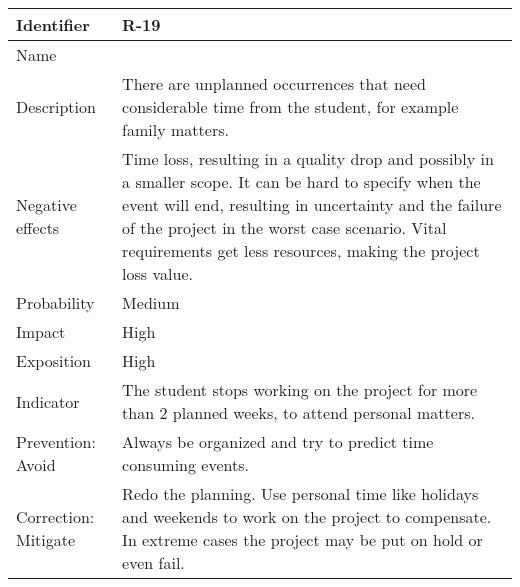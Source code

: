 \begin{table}[H]
	\begin{tabularx}{\textwidth}{|y|z|}
		\hline
		Identifier & \textbf{R-19} \\ \hline
		Name & \Rdiecinueve \\ \hline
		Description &
			There are unplanned occurrences that need considerable time from the student, for example family matters.
		\\ \hline
		Negative effects &
			Time loss, resulting in a quality drop and possibly in a smaller scope.\linej
			It can be hard to specify when the event will end, resulting in uncertainty and the failure of the project in the worst case scenario.
			\linej
			Vital requirements get less resources, making the project loss value.
		\\ \hline
		Probability & Medium\\ \hline
		Impact & High\\ \hline
		Exposition & High\\ \hline
		Indicator & The student stops working on the project for more than 2 planned weeks, to attend personal matters.\\ \hline
		Prevention: Avoid &
			Always be organized and try to predict time consuming events.
		\\ \hline
		Correction: Mitigate &
			Redo the planning. \linej
			Use personal time like holidays and weekends to work on the project to compensate.
			In extreme cases the project may be put on hold or even fail.
		\\ \hline
	\end{tabularx}
\end{table}

